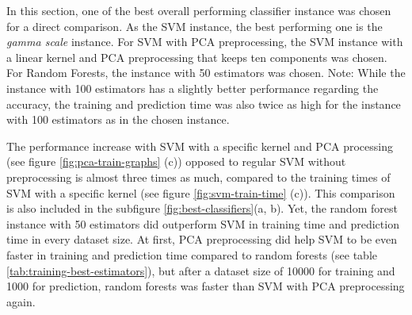 \documentclass{article}[12pt]
\theoremstyle{mydef}
\begin{document}
        In this section, one of the best overall performing classifier instance was chosen for a direct comparison. 
        As the SVM instance, the best performing one is the \emph{gamma scale} instance.
        For SVM with PCA preprocessing, the SVM instance with a linear kernel and PCA preprocessing that keeps ten components was chosen.
        For Random Forests, the instance with 50 estimators was chosen. 
        Note: While the instance with 100 estimators has a slightly better performance regarding the accuracy, the training and prediction time was also twice as high for the instance with 100 estimators as in the chosen instance.

        The performance increase with SVM with a specific kernel and PCA processing (see figure \ref{fig:pca-train-graphs} (c)) opposed to regular SVM without preprocessing is almost three times as much, 
        compared to the training times of SVM with a specific kernel (see figure \ref{fig:svm-train-time} (c)). This comparison is also included in the subfigure \ref{fig:best-classifiers}(a, b). 
        Yet, the random forest instance with 50 estimators did outperform SVM in training time and prediction time in every dataset size.
        At first, PCA preprocessing did help SVM to be even faster in training and prediction time compared to random forests (see table \ref{tab:training-best-estimators}), but after a dataset size of 10000 for training and 1000 for prediction, 
        random forests was faster than SVM with PCA preprocessing again. 



\end{document}
